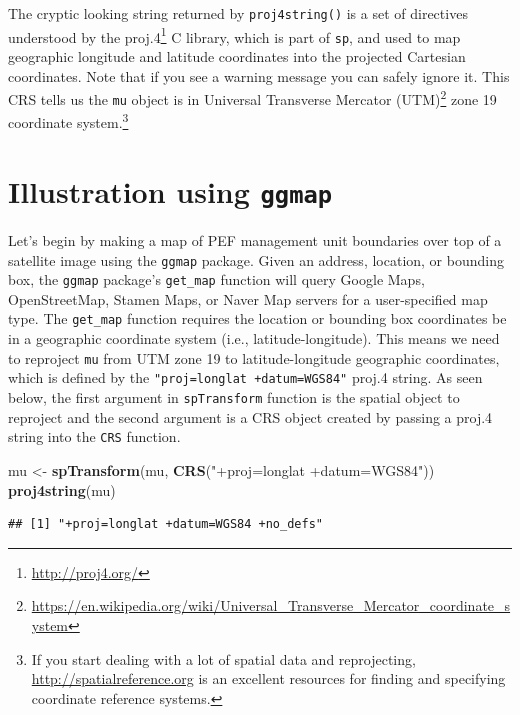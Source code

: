 \documentclass[
]{krantz}
\newenvironment{Shaded}{\begin{snugshade}}{\end{snugshade}}
\newcommand{\KeywordTok}[1]{\textcolor[rgb]{0.13,0.29,0.53}{\textbf{#1}}}
\newcommand{\NormalTok}[1]{#1}
\newcommand{\StringTok}[1]{\textcolor[rgb]{0.31,0.60,0.02}{#1}}
\renewcommand{\href}[2]{#2\footnote{\url{#1}}}
\begin{document}
The cryptic looking string returned by \texttt{proj4string()} is a set of directives understood by the \href{http://proj4.org/}{proj.4} C library, which is part of \texttt{sp}, and used to map geographic longitude and latitude coordinates into the projected Cartesian coordinates. Note that if you see a warning message you can safely ignore it. This CRS tells us the \texttt{mu} object is in \href{https://en.wikipedia.org/wiki/Universal_Transverse_Mercator_coordinate_system}{Universal Transverse Mercator (UTM)} zone 19 coordinate system.\footnote{If you start dealing with a lot of spatial data and reprojecting, \url{http://spatialreference.org} is an excellent resources for finding and specifying coordinate reference systems.}

\hypertarget{ggmap}{%
\section{\texorpdfstring{Illustration using \texttt{ggmap}}{Illustration using ggmap}}\label{ggmap}}

Let's begin by making a map of PEF management unit boundaries over top of a satellite image using the \texttt{ggmap} package. Given an address, location, or bounding box, the \texttt{ggmap} package's \texttt{get\_map} function will query Google Maps, OpenStreetMap, Stamen Maps, or Naver Map servers for a user-specified map type. The \texttt{get\_map} function requires the location or bounding box coordinates be in a geographic coordinate system (i.e., latitude-longitude). This means we need to reproject \texttt{mu} from UTM zone 19 to latitude-longitude geographic coordinates, which is defined by the \texttt{\textquotesingle{}"proj=longlat\ +datum=WGS84"\textquotesingle{}} proj.4 string. As seen below, the first argument in \texttt{spTransform} function is the spatial object to reproject and the second argument is a CRS object created by passing a proj.4 string into the \texttt{CRS} function.

\begin{Shaded}
\begin{Highlighting}[]
\NormalTok{mu \textless{}{-}}\StringTok{ }\KeywordTok{spTransform}\NormalTok{(mu, }\KeywordTok{CRS}\NormalTok{(}\StringTok{"+proj=longlat +datum=WGS84"}\NormalTok{))}
\KeywordTok{proj4string}\NormalTok{(mu)}
\end{Highlighting}
\end{Shaded}

\begin{verbatim}
## [1] "+proj=longlat +datum=WGS84 +no_defs"
\end{verbatim}
\end{document}
